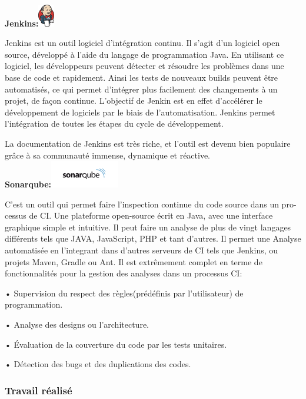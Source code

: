 \documentclass[12pt]{article}
\begin{document}
\textbf{Jenkins:}\includegraphics[width=7mm,scale=0.5]{diagrammes/jenkins.png}

Jenkins est un outil logiciel d’intégration continu. Il s’agit d’un logiciel open source, développé à l’aide du langage de programmation Java. En utilisant ce logiciel, les développeurs peuvent détecter et résoudre les problèmes dans une base de code et rapidement. Ainsi les tests de nouveaux builds peuvent être automatisés, ce qui permet d’intégrer plus facilement des changements à un projet, de façon continue. L’objectif de Jenkin est en effet d’accélérer le développement de logiciels par le biais de l’automatisation. Jenkins permet l’intégration de toutes les étapes du cycle de développement.


La documentation de Jenkins est très riche, et l’outil est devenu bien populaire grâce à sa communauté immense, dynamique et réactive.\\
\newpage
\textbf{Sonarqube:}\includegraphics[width=30mm,scale=0.5]{diagrammes/sonarqube.png}

C’est un outil qui permet faire l’inspection continue du code source dans un pro-cessus de CI. Une plateforme open-source écrit en Java, avec une interface graphique simple et intuitive. Il peut faire un analyse de plus de vingt langages différents tels que JAVA, JavaScript, PHP et tant d’autres.
Il permet une Analyse automatisée en l’integrant dans d’autres serveurs de CI tels que Jenkins, ou projets Maven, Gradle ou Ant. Il est extrêmement complet en terme de fonctionnalités pour la gestion des analyses dans un processus CI:

• Supervision du respect des règles(prédéfinis par l’utilisateur) de programmation.

• Analyse des designs ou l’architecture.

• Évaluation de la couverture du code par les tests unitaires.

• Détection des bugs et des duplications des codes.
 
\subsubsection{Travail réalisé}
\end{document}
